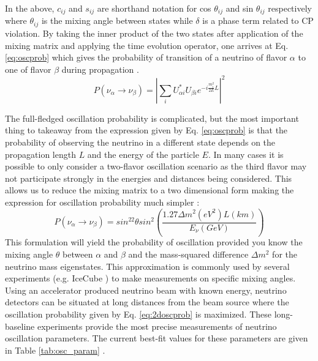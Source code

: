 \documentclass{gatech-thesis}
\begin{document}
In the above, $c_{ij}$ and $s_{ij}$ are shorthand notation for cos $ \theta_{ij}$ and sin $\theta_{ij}$ respectively where $\theta_{ij}$ is the mixing angle between states while $\delta$ is a phase term related to CP violation. By taking the inner product of the two states after application of the mixing matrix and applying the time evolution operator, one arrives at Eq. \ref{eq:oscprob} which gives the probability of transition of a neutrino of flavor $\alpha$ to one of flavor $\beta$ during propagation \cite{2008PrPNP..60..338N}.
\begin{equation}\label{eq:oscprob}
P(\nu_{\alpha}\rightarrow \nu_{\beta}) = \left| \sum_{i} U_{\alpha i}^* U_{\beta i} e^{-i\frac{m_{i}^2}{2E}L}\right| ^2
\end{equation}

The full-fledged oscillation probability is complicated, but the most important thing to takeaway from the expression given by Eq. \ref{eq:oscprob} is that the probability of observing the neutrino in a different state depends on the propagation length $L$ and the energy of the particle $E$. In many cases it is possible to only consider a two-flavor oscillation scenario as the third flavor may not participate strongly in the energies and distances being considered. This allows us to reduce the mixing matrix to a two dimensional form making the expression for oscillation probability much simpler \cite{1998PhRvL..81.1562F}:
\begin{equation}\label{eq:2doscprob}
P(\nu_{\alpha}\rightarrow \nu_{\beta}) = sin^22\theta sin^2\left(\frac{1.27\Delta m^2 (eV^2) L (km)}{E_\nu (GeV)}\right)
\end{equation}
This formulation will yield the probability of oscillation provided you know the mixing angle $\theta$ between $\alpha$ and $\beta$ and the mass-squared difference $\Delta m^2$ for the neutrino mass eigenstates. This approximation is commonly used by several experiments (e.g. IceCube \cite{2013PhRvL.111h1801A}) to make measurements on specific mixing angles. Using an accelerator produced neutrino beam with known energy, neutrino detectors can be situated at long distances from the beam source where the oscillation probability given by Eq. \ref{eq:2doscprob} is maximized. These long-baseline experiments provide the most precise measurements of neutrino oscillation parameters. The current best-fit values for these parameters are given in Table \ref{tab:osc_param} \cite{PhysRevD.89.093018}.
\end{document}
